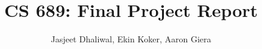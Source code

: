 \documentclass[12pt]{article}%
\begin{document}
\title{CS 689: Final Project Report}
\author{Jasjeet Dhaliwal, Ekin Koker, Aaron Giera}
\maketitle
\end{document}
